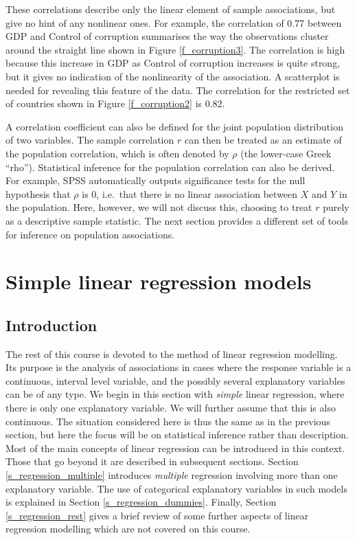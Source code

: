 These correlations describe only
the linear element of sample associations, but give no
hint of any nonlinear ones. For example, the correlation of 0.77
between GDP and Control of corruption
summarises the way the observations
cluster around the straight line shown in
Figure \ref{f_corruption3}. The correlation is
high because this increase in GDP as Control of corruption increases is
quite strong, but it gives no indication of the nonlinearity of the
association. A scatterplot is needed for revealing
this feature of the data. The correlation for the restricted set of
countries shown in Figure \ref{f_corruption2} is 0.82.

A correlation coefficient can also be defined for the joint population
distribution of two variables. The sample correlation $r$ can then be
treated as an estimate of the population correlation, which is often
denoted by $\rho$ (the lower-case Greek ``rho''). Statistical inference
for the population correlation can also be derived. For example, SPSS
automatically outputs significance tests for the null hypothesis that
$\rho$ is 0, i.e.\ that there is no linear association between $X$ and
$Y$ in the population. Here, however, we will not discuss this, choosing
to treat $r$ purely as a descriptive sample statistic.
The next section provides a different set of tools for
inference on population associations.

\section{Simple linear regression models}
\label{s_regression_simple}

\subsection{Introduction}
\label{ss_regression_simple_intro}

The rest of this course is devoted to the method of linear regression
modelling. Its
purpose is the analysis of associations in cases where the response
variable is a continuous, interval level variable, and the
possibly several explanatory variables can be of any type. We begin
in this section with \emph{simple} linear regression, where
there is only one explanatory variable. We will further assume that this
is also continuous. The situation considered here is thus the same as in
the previous section, but here the focus will be on statistical
inference rather than description. Most of the main concepts of linear
regression can be introduced in this context. Those that go beyond it
are described in subsequent sections. Section \ref{s_regression_multiple}
introduces \emph{multiple} regression involving more than
one explanatory variable. The use of categorical explanatory variables
in such models is explained in Section \ref{s_regression_dummies}. Finally,
Section \ref{s_regression_rest} gives a brief review of some further
aspects of linear regression modelling which are not covered on this
course.

